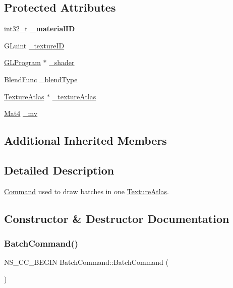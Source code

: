 \subsection*{Protected Attributes}
\begin{DoxyCompactItemize}
\item 
\mbox{\label{classBatchCommand_a0c38e4396d7d151f13080ed4a0003390}} 
int32\+\_\+t {\bfseries \+\_\+material\+ID}
\item 
G\+Luint \hyperlink{classBatchCommand_abfc6a1e43ec6c7c030699d5a057c6865}{\+\_\+texture\+ID}
\item 
\hyperlink{classGLProgram}{G\+L\+Program} $\ast$ \hyperlink{classBatchCommand_ae4845fdc280485ac6058058fa663ea3a}{\+\_\+shader}
\item 
\hyperlink{structBlendFunc}{Blend\+Func} \hyperlink{classBatchCommand_af4546dfb461c3f5093688a1456839260}{\+\_\+blend\+Type}
\item 
\hyperlink{classTextureAtlas}{Texture\+Atlas} $\ast$ \hyperlink{classBatchCommand_a0ee7b43fdbd09066770f40fd17193d1f}{\+\_\+texture\+Atlas}
\item 
\hyperlink{classMat4}{Mat4} \hyperlink{classBatchCommand_ae916df5b25e735ba236a470953becf68}{\+\_\+mv}
\end{DoxyCompactItemize}
\subsection*{Additional Inherited Members}


\subsection{Detailed Description}
\hyperlink{classCommand}{Command} used to draw batches in one \hyperlink{classTextureAtlas}{Texture\+Atlas}. 

\subsection{Constructor \& Destructor Documentation}
\mbox{\label{classBatchCommand_ad6eefd9a6d6ddbd2f5591de8a1c9ff6f}} 
\subsubsection{\texorpdfstring{Batch\+Command()}{BatchCommand()}\hspace{0.1cm}{\footnotesize\ttfamily [1/2]}}
{\footnotesize\ttfamily N\+S\+\_\+\+C\+C\+\_\+\+B\+E\+G\+IN Batch\+Command\+::\+Batch\+Command (\begin{DoxyParamCaption}{ }\end{DoxyParamCaption})}

